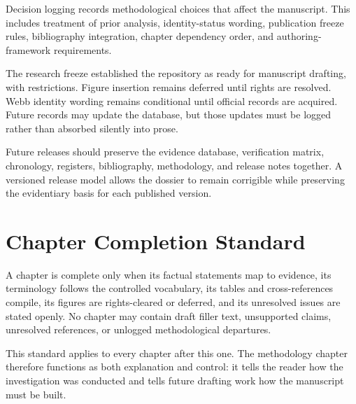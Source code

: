 Decision logging records methodological choices that affect the manuscript. This includes treatment of prior analysis, identity-status wording, publication freeze rules, bibliography integration, chapter dependency order, and authoring-framework requirements.

The research freeze established the repository as ready for manuscript drafting, with restrictions. Figure insertion remains deferred until rights are resolved. Webb identity wording remains conditional until official records are acquired. Future records may update the database, but those updates must be logged rather than absorbed silently into prose.

Future releases should preserve the evidence database, verification matrix, chronology, registers, bibliography, methodology, and release notes together. A versioned release model allows the dossier to remain corrigible while preserving the evidentiary basis for each published version.

\section{Chapter Completion Standard}

A chapter is complete only when its factual statements map to evidence, its terminology follows the controlled vocabulary, its tables and cross-references compile, its figures are rights-cleared or deferred, and its unresolved issues are stated openly. No chapter may contain draft filler text, unsupported claims, unresolved references, or unlogged methodological departures.

This standard applies to every chapter after this one. The methodology chapter therefore functions as both explanation and control: it tells the reader how the investigation was conducted and tells future drafting work how the manuscript must be built.
